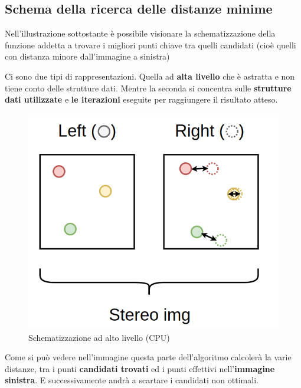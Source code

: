 \documentclass[12pt,a4paper]{report}
\begin{document}
\newpage
\subsection{Schema della ricerca delle distanze minime} \label{ricerca-candidati}

Nell'illustrazione sottostante è possibile visionare la schematizzazione della funzione addetta a trovare i migliori punti chiave tra quelli candidati (cioè quelli con distanza minore dall'immagine a sinistra)

Ci sono due tipi di rappresentazioni. Quella ad \textbf{alta livello} che è astratta e non tiene conto delle strutture dati. Mentre la seconda si concentra sulle \textbf{strutture dati utilizzate} e \textbf{le iterazioni} eseguite per raggiungere il risultato atteso.

\begin{figure}[H]
    \centering
    \includegraphics[width=0.5\linewidth]{img/find_distance_high_scheme.png}
    \caption{Schematizzazione ad alto livello (CPU) }
\end{figure}

Come si può vedere nell'immagine questa parte dell'algoritmo calcolerà la varie distanze, tra i punti \textbf{candidati trovati} ed i punti effettivi nell'\textbf{immagine sinistra}.
E successivamente andrà a scartare i candidati non ottimali.
\end{document}
